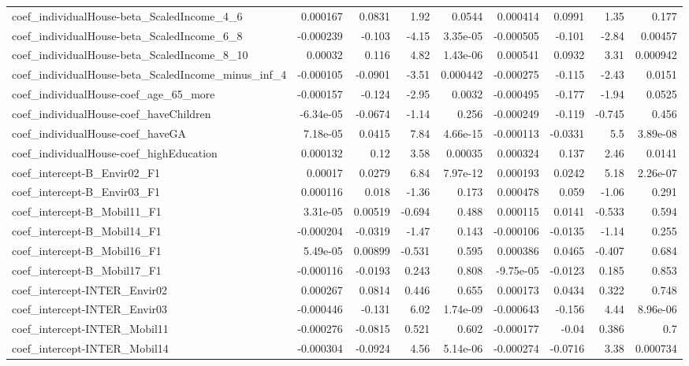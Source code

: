 \begin{tabular}{lrrrrrrrr}
coef_individualHouse-beta_ScaledIncome_4_6 & 0.000167 & 0.0831 & 1.92 & 0.0544 & 0.000414 & 0.0991 & 1.35 & 0.177 \\
coef_individualHouse-beta_ScaledIncome_6_8 & -0.000239 & -0.103 & -4.15 & 3.35e-05 & -0.000505 & -0.101 & -2.84 & 0.00457 \\
coef_individualHouse-beta_ScaledIncome_8_10 & 0.00032 & 0.116 & 4.82 & 1.43e-06 & 0.000541 & 0.0932 & 3.31 & 0.000942 \\
coef_individualHouse-beta_ScaledIncome_minus_inf_4 & -0.000105 & -0.0901 & -3.51 & 0.000442 & -0.000275 & -0.115 & -2.43 & 0.0151 \\
coef_individualHouse-coef_age_65_more & -0.000157 & -0.124 & -2.95 & 0.0032 & -0.000495 & -0.177 & -1.94 & 0.0525 \\
coef_individualHouse-coef_haveChildren & -6.34e-05 & -0.0674 & -1.14 & 0.256 & -0.000249 & -0.119 & -0.745 & 0.456 \\
coef_individualHouse-coef_haveGA & 7.18e-05 & 0.0415 & 7.84 & 4.66e-15 & -0.000113 & -0.0331 & 5.5 & 3.89e-08 \\
coef_individualHouse-coef_highEducation & 0.000132 & 0.12 & 3.58 & 0.00035 & 0.000324 & 0.137 & 2.46 & 0.0141 \\
coef_intercept-B_Envir02_F1 & 0.00017 & 0.0279 & 6.84 & 7.97e-12 & 0.000193 & 0.0242 & 5.18 & 2.26e-07 \\
coef_intercept-B_Envir03_F1 & 0.000116 & 0.018 & -1.36 & 0.173 & 0.000478 & 0.059 & -1.06 & 0.291 \\
coef_intercept-B_Mobil11_F1 & 3.31e-05 & 0.00519 & -0.694 & 0.488 & 0.000115 & 0.0141 & -0.533 & 0.594 \\
coef_intercept-B_Mobil14_F1 & -0.000204 & -0.0319 & -1.47 & 0.143 & -0.000106 & -0.0135 & -1.14 & 0.255 \\
coef_intercept-B_Mobil16_F1 & 5.49e-05 & 0.00899 & -0.531 & 0.595 & 0.000386 & 0.0465 & -0.407 & 0.684 \\
coef_intercept-B_Mobil17_F1 & -0.000116 & -0.0193 & 0.243 & 0.808 & -9.75e-05 & -0.0123 & 0.185 & 0.853 \\
coef_intercept-INTER_Envir02 & 0.000267 & 0.0814 & 0.446 & 0.655 & 0.000173 & 0.0434 & 0.322 & 0.748 \\
coef_intercept-INTER_Envir03 & -0.000446 & -0.131 & 6.02 & 1.74e-09 & -0.000643 & -0.156 & 4.44 & 8.96e-06 \\
coef_intercept-INTER_Mobil11 & -0.000276 & -0.0815 & 0.521 & 0.602 & -0.000177 & -0.04 & 0.386 & 0.7 \\
coef_intercept-INTER_Mobil14 & -0.000304 & -0.0924 & 4.56 & 5.14e-06 & -0.000274 & -0.0716 & 3.38 & 0.000734 \\

\end{tabular}
